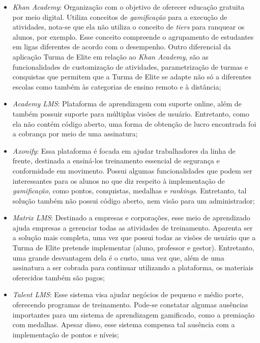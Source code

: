 \begin{itemize}

\item {\textit{Khan Academy}:} Organização com o objetivo de oferecer educação gratuita por meio digital. Utiliza conceitos de \textit{gamificação} para a execução de atividades, nota-se que ela não utiliza o conceito de \textit{\glspl{tier}} para ranquear os alunos, por exemplo. Esse conceito compreende o agrupamento de estudantes em ligas diferentes de acordo com o desempenho. Outro diferencial da aplicação Turma de Elite em relação ao \textit{Khan Academy}, são as funcionalidades de customização de atividades, parametrização de turmas e conquistas que permitem que a Turma de Elite se adapte não só a diferentes escolas como também às categorias de ensino remoto e à distância;

\item {\textit{Academy LMS}:} Plataforma de aprendizagem com suporte online, além de também possuir suporte para múltiplas visões de usuário.
Entretanto, como ela não contém código aberto, uma forma de obtenção de lucro encontrada foi a cobrança por meio de uma assinatura;

\item{\textit{Axonify}:} Essa plataforma é focada em ajudar trabalhadores da linha de frente, destinada a ensiná-los treinamento essencial de segurança e conformidade em movimento. Possui algumas funcionalidades que podem ser interessantes para os alunos no que diz respeito à implementação de \textit{gamificação}, como pontos, conquistas, medalhas e \textit{\glspl{ranking}}. Entretanto, tal solução também não possui código aberto, nem visão para um administrador;

\item{\textit{Matrix LMS}:} Destinado a empresas e corporações, esse meio de aprendizado ajuda empresas a gerenciar todas as atividades de treinamento. Aparenta ser a solução mais completa, uma vez que possui todas as visões de usuário que a Turma de Elite pretende implementar (aluno, professor e gestor). Entretanto, uma grande desvantagem dela é o custo, uma vez que, além de uma assinatura a ser cobrada para continuar utilizando a plataforma, os materiais oferecidos também são pagos;

\item{\textit{Talent LMS}:} Esse sistema visa ajudar negócios de pequeno e médio porte, oferecendo programas de treinamento. Pode-se constatar algumas ausências importantes para um sistema de aprendizagem gamificado, como a premiação com medalhas. Apesar disso, esse sistema compensa tal ausência com a implementação de pontos e níveis;



\end{itemize}
